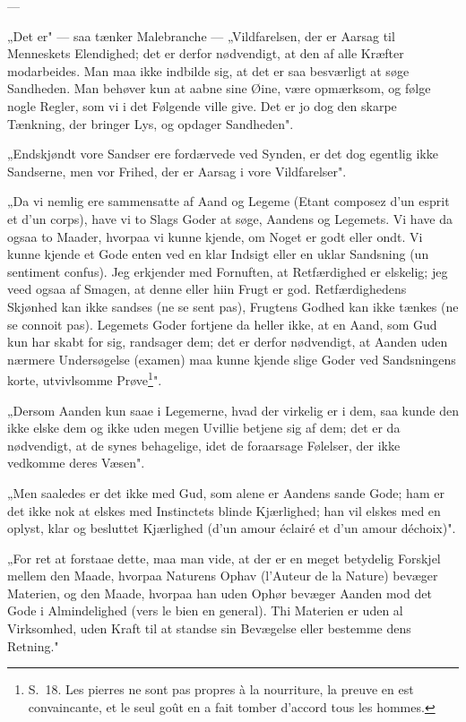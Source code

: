 \documentclass[12pt,a4paper]{article}
\newcommand{\opage}[1]{\marginnote{\footnotesize\textit{[#1]}}}
\begin{document}
\begin{center}---\end{center}

„Det er" --- saa tænker Malebranche --- „Vildfarelsen, der er Aarsag til
Menneskets Elendighed; det er derfor nødvendigt, at den af alle Kræfter
modarbeides. Man maa ikke indbilde sig, at det er saa besværligt at søge
Sandheden. Man behøver kun at aabne sine Øine, være opmærksom, og følge
nogle Regler, som vi i det Følgende ville give. Det er jo dog den skarpe
Tænkning, der bringer Lys, og opdager Sandheden".

„Endskjøndt vore Sandser ere fordærvede ved Synden, er det dog
egentlig ikke Sandserne, men vor Frihed, der er Aarsag i vore Vildfarelser".

\opage{7} „Da vi nemlig ere sammensatte af Aand og Legeme (Etant composez
d'un esprit et d'un corps), have vi to Slags Goder at søge, Aandens og
Legemets. Vi have da ogsaa to Maader, hvorpaa vi kunne kjende, om Noget
er godt eller ondt. Vi kunne kjende et Gode enten ved en klar Indsigt eller
en uklar Sandsning (un sentiment confus). Jeg erkjender med Fornuften,
at Retfærdighed er elskelig; jeg veed ogsaa af Smagen, at denne eller hiin
Frugt er god. Retfærdighedens Skjønhed kan ikke sandses (ne se sent pas),
Frugtens Godhed kan ikke tænkes (ne se connoit pas). Legemets Goder
fortjene da heller ikke, at en Aand, som Gud kun har skabt for sig, randsager
dem; det er derfor nødvendigt, at Aanden uden nærmere Undersøgelse (examen)
maa kunne kjende slige Goder ved Sandsningens korte, utvivlsomme
Prøve\footnote{S.~18. Les pierres ne sont pas propres à la nourriture, la preuve
en est convaincante, et le seul goût en a fait tomber d'accord tous les
hommes.}".

„Dersom Aanden kun saae i Legemerne, hvad der virkelig er i dem,
saa kunde den ikke elske dem og ikke uden megen Uvillie betjene sig af dem;
det er da nødvendigt, at de synes behagelige, idet de foraarsage Følelser, der
ikke vedkomme deres Væsen".

„Men saaledes er det ikke med Gud, som alene er Aandens sande
Gode; ham er det ikke nok at elskes med Instinctets blinde Kjærlighed; han
vil elskes med en oplyst, klar og besluttet Kjærlighed (d'un amour éclairé et
d'un amour déchoix)".

„For ret at forstaae dette, maa man vide, at der er en meget betydelig
Forskjel mellem den Maade, hvorpaa Naturens Ophav (l'Auteur de la Nature)
bevæger Materien, og den Maade, hvorpaa han uden Ophør bevæger Aanden
mod det Gode i Almindelighed (vers le bien en general). Thi Materien
er uden al Virksomhed, uden Kraft til at standse sin Bevægelse eller bestemme
dens Retning."
\end{document}
